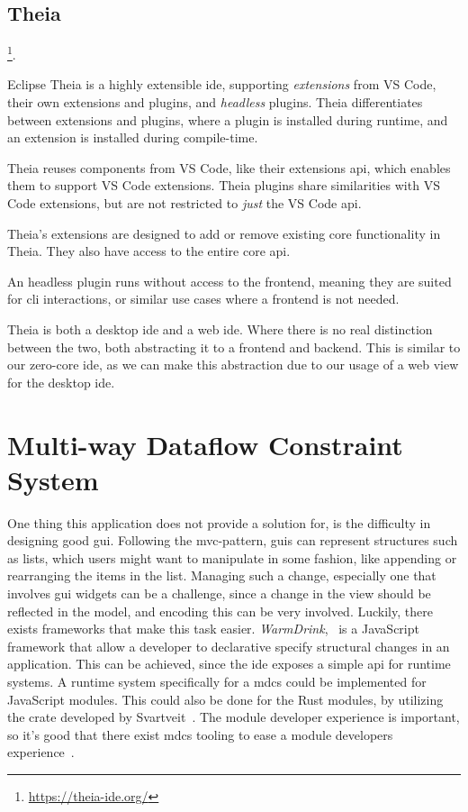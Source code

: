 \subsection{Theia}

\footnote{\url{https://theia-ide.org/}}.

Eclipse Theia is a highly extensible \gls*{ide}, supporting \textit{extensions}
from VS Code, their own extensions and plugins, and \textit{headless} plugins.
Theia differentiates between extensions and plugins, where a plugin is installed
during runtime, and an extension is installed during compile-time.

Theia reuses components from VS Code, like their extensions \gls*{api}, which
enables them to support VS Code extensions. Theia plugins share similarities
with VS Code extensions, but are not restricted to \textit{just} the VS Code
\gls*{api}.

Theia's extensions are designed to add or remove existing core functionality in
Theia. They also have access to the entire core \gls*{api}.

An headless plugin runs without access to the frontend, meaning they are suited
for \gls*{cli} interactions, or similar use cases where a frontend is not
needed.

Theia is both a desktop \gls*{ide} and a web \gls*{ide}. Where there is no real
distinction between the two, both abstracting it to a frontend and backend. This
is similar to our zero-core \gls*{ide}, as we can make this abstraction due to
our usage of a web view for the desktop \gls*{ide}.


\section{Multi-way Dataflow Constraint System} \label{sec:mdcs}

One thing this application does not provide a solution for, is the difficulty
in designing good \gls*{gui}. Following the \gls*{mvc}-pattern, \gls*{gui}s can
represent structures such as lists, which users might want to manipulate in
some fashion, like appending or rearranging the items in the list. Managing such
a change, especially one that involves \gls*{gui} widgets can be a challenge,
since a change in the view should be reflected in the model, and encoding this
can be very involved. Luckily, there exists frameworks that make this task
easier. \textit{WarmDrink},~\cite{warmDrink, dslMdcs} is a JavaScript
framework that allow a developer to declarative specify structural changes in
an application. This can be achieved, since the \gls*{ide} exposes a simple
\gls*{api} for runtime systems. A runtime system specifically for a \gls*{mdcs}
could be implemented for JavaScript modules. This could also be done for the
Rust modules, by utilizing the crate developed by Svartveit~\cite{mcdsRust}.
The module developer experience is important, so it's good that there exist
\gls*{mdcs} tooling to ease a module developers experience~\cite{toolMcds}.

